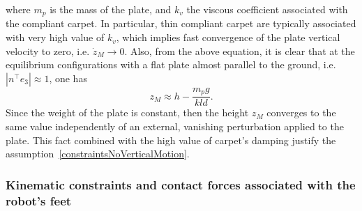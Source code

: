 \documentclass[12pt,a4paper,twoside]{article}
\begin{document}
where $m_p$ is the mass of the plate, and $k_v$ the viscous coefficient associated with the compliant carpet. In particular, thin compliant carpet are
typically  associated with very high value of $k_v$, which implies fast convergence of the plate vertical velocity to zero, i.e. $\dot{z}_M \rightarrow 0$. Also,  from the above equation, it is clear that at the equilibrium configurations with a flat plate almost parallel to the ground, i.e. $|n^\top e_3| \approx 1$, one has 
\begin{equation}
 z_M  \approx h-\frac{m_pg}{kld}  . \nonumber
\end{equation}
Since the weight of the plate is constant, then the height $z_M$ converges to the same value independently of an external, vanishing perturbation applied to the plate. This fact combined with the high value of carpet's damping justify the assumption~\eqref{constraintsNoVerticalMotion}.



\subsubsection{Kinematic constraints and contact forces associated with the robot's feet}
\end{document}
